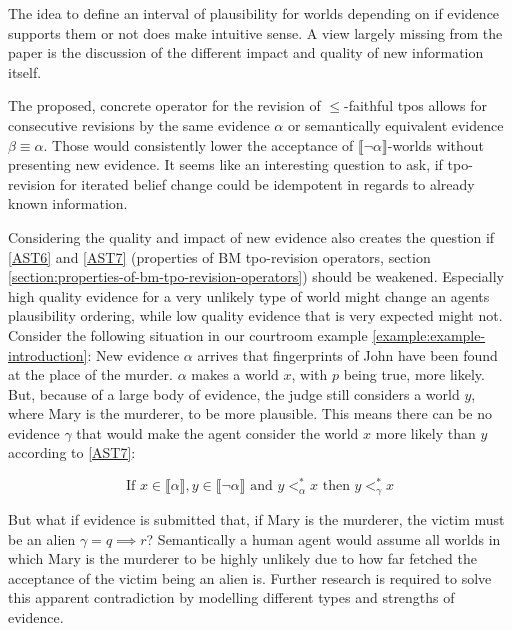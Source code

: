 \documentclass[english, 12pt]{scrartcl}
\theoremstyle{definition}
\theoremstyle{definition}
\theoremstyle{definition}
\newcommand{\modelsOf}[1]{\llbracket #1 \rrbracket}
\begin{document}
The idea to define an interval of plausibility for worlds depending on if evidence supports them or not does make intuitive sense. A view largely missing from the paper is the discussion of the different impact and quality of new information itself.

The proposed, concrete operator for the revision of $\leq$-faithful tpos allows for consecutive revisions by the same evidence $\alpha$ or semantically equivalent evidence $\beta \equiv \alpha$. Those would consistently lower the acceptance of $\modelsOf{\neg\alpha}$-worlds without presenting new evidence. It seems like an interesting question to ask, if tpo-revision for iterated belief change could be idempotent in regards to already known information.

Considering the quality and impact of new evidence also creates the question if \ref{AST6} and \ref{AST7} (properties of BM tpo-revision operators, section \ref{section:properties-of-bm-tpo-revision-operators}) should be weakened. Especially high quality evidence for a very unlikely type of world might change an agents plausibility ordering, while low quality evidence that is very expected might not. Consider the following situation in our courtroom example \ref{example:example-introduction}: New evidence $\alpha$ arrives that fingerprints of John have been found at the place of the murder. $\alpha$  makes a world $x$, with $p$ being true, more likely. But, because of a large body of evidence, the judge still considers a world $y$, where Mary is the murderer, to be more plausible. This means there can be no evidence $\gamma$ that would make the agent consider the world $x$ more likely than $y$ according to \ref{AST7}:

\begin{equation*}
    \textrm{If } x \in \modelsOf{\alpha}, y \in \modelsOf{\neg\alpha} \textrm{ and } y <_{\alpha}^{\ast} x \textrm{ then } y <_{\gamma}^{\ast} x
\end{equation*}

But what if evidence is submitted that, if Mary is the murderer, the victim must be an alien $\gamma = q \implies r$? Semantically a human agent would assume all worlds in which Mary is the murderer to be highly unlikely due to how far fetched the acceptance of the victim being an alien is. Further research is required to solve this apparent contradiction by modelling different types and strengths of evidence.

\newpage

\typeout{}


\end{document}
